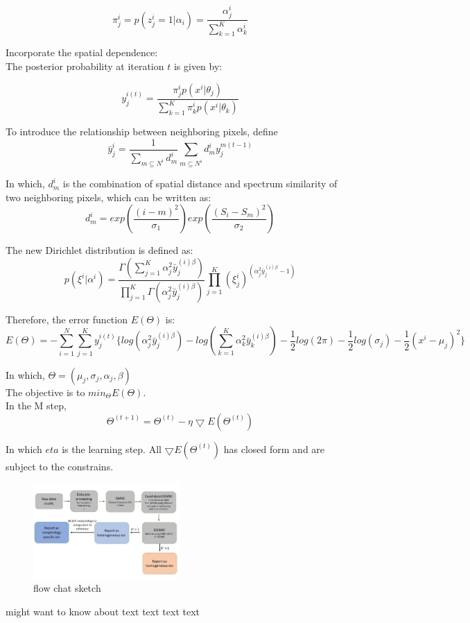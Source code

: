 \documentclass{bioinfo}
\begin{document}
$$\pi^i_j=p(z^i_j=1|\alpha_i)=\frac{\alpha^i_j}{\sum_{k=1}^{K}\alpha^i_k}$$

Incorporate the spatial dependence:\\

The posterior probability at iteration $t$ is given by:


$$y^{i(t)}_j=\frac{\pi^i_jp(x^i|\theta_j)}{\sum_{k=1}^{K}\pi^i_kp(x^i|\theta_k)}$$

To introduce the relationship between neighboring pixels, define\\

$$\bar{y}^{i}_j=\frac{1}{\sum_{m\subseteq N^i}d^i_m}\sum_{m\subseteq N^i}d^i_{m}y^{m(t-1)}_j$$

In which, $d^i_m$ is the combination of spatial distance and spectrum similarity of two neighboring pixels, which can be written as:\\

$$d^i_m=exp(\frac{(i-m)^2}{\sigma_1})exp(\frac{(S_i-S_m)^2}{\sigma_2})$$

The new Dirichlet distribution is defined as:\\
$$p(\xi ^i|\alpha^i)=\frac{\Gamma (\sum_{j=1}^{K}\alpha_j^2 \bar{y}^{(i)\beta}_j)}{\prod_{j=1}^{K}\Gamma (\alpha_j^2 \bar{y}^{(i)\beta}_j)}\prod_{j=1}^{K}(\xi^i_j)^{(\alpha_j^2 \bar{y}^{(i)\beta}_j-1)}$$

Therefore, the error function $E(\Theta )$ is:
$$E(\Theta )=-\sum_{i=1}^{N}\sum_{j=1}^{K}y^{i(t)}_j\{log(\alpha_j^2\bar{y}^{(i)\beta}_j)-log(\sum_{k=1}^{K}\alpha_k^2\bar{y}^{(i)\beta}_k)-\frac{1}{2}log(2\pi)-\frac{1}{2}log(\sigma_j)-\frac{1}{2}(x^i-\mu_j)^2\}$$

In which, $\Theta =(\mu_j, \sigma_j, \alpha_j, \beta)$\\

The objective is to $min_\Theta E(\Theta)$.\\


In the M step,
$$\Theta ^{(t+1)}=\Theta ^{(t)}-\eta \bigtriangledown E(\Theta ^{(t)})$$

In which $eta$ is the learning step. All $\bigtriangledown E(\Theta ^{(t)})$ has closed form and are subject to the constrains.



\begin{figure}[b!]

	\includegraphics[width=0.5\textwidth]{figure3.jpg}
    \caption{flow chat sketch}
    \label{fig:figure3}
\end{figure}
\citealp{Boffelli03} might want to know about text text text
text\vspace*{1pt}
\end{document}
